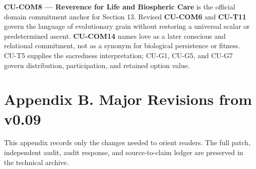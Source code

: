 \documentclass[
  11pt,
]{article}
\begin{document}
\textbf{CU-COM8 --- Reverence for Life and Biospheric Care} is the
official domain commitment anchor for Section 13. Revised
\textbf{CU-COM6} and \textbf{CU-T11} govern the language of evolutionary
grain without restoring a universal scalar or predetermined ascent.
\textbf{CU-COM14} names love as a later conscious and relational
commitment, not as a synonym for biological persistence or fitness.
CU-T5 supplies the sacredness interpretation; CU-G1, CU-G5, and CU-G7
govern distribution, participation, and retained option value.

\section{Appendix B. Major Revisions from
v0.09}\label{appendix-b.-major-revisions-from-v0.09}

This appendix records only the changes needed to orient readers. The
full patch, independent audit, audit response, and source-to-claim
ledger are preserved in the technical archive.
\end{document}
